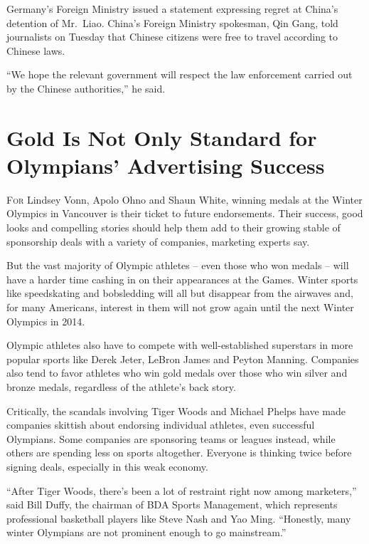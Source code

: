 ﻿\documentclass[12pt]{article}
\begin{document}
Germany's Foreign Ministry issued a statement expressing regret at China's detention of Mr.~Liao.
China's Foreign Ministry spokesman, Qin Gang, told journalists on Tuesday that Chinese citizens were
free to travel according to Chinese laws.

``We hope the relevant government will respect the law enforcement carried out by the Chinese
authorities,'' he said.

\section{Gold Is Not Only Standard for Olympians' Advertising Success}

\lettrine{F}{or} Lindsey Vonn, Apolo Ohno and Shaun White, winning medals at
the Winter Olympics in Vancouver is their ticket to future endorsements. Their success, good looks
and compelling stories should help them add to their growing stable of sponsorship deals with a
variety of companies, marketing experts say.

But the vast majority of Olympic athletes -- even those who won medals -- will have a harder time
cashing in on their appearances at the Games. Winter sports like speedskating and bobsledding will
all but disappear from the airwaves and, for many Americans, interest in them will not grow again
until the next Winter Olympics in 2014.


Olympic athletes also have to compete with well-established superstars in more popular sports like
Derek Jeter, LeBron James and Peyton Manning. Companies also tend to favor athletes who win gold
medals over those who win silver and bronze medals, regardless of the athlete's back story.

Critically, the scandals involving Tiger Woods and Michael Phelps have made companies skittish about
endorsing individual athletes, even successful Olympians. Some companies are sponsoring teams or
leagues instead, while others are spending less on sports altogether. Everyone is thinking twice
before signing deals, especially in this weak economy.

``After Tiger Woods, there's been a lot of restraint right now among marketers,'' said Bill Duffy,
the chairman of BDA Sports Management, which represents professional basketball players like Steve
Nash and Yao Ming. ``Honestly, many winter Olympians are not prominent enough to go mainstream.''
\end{document}
